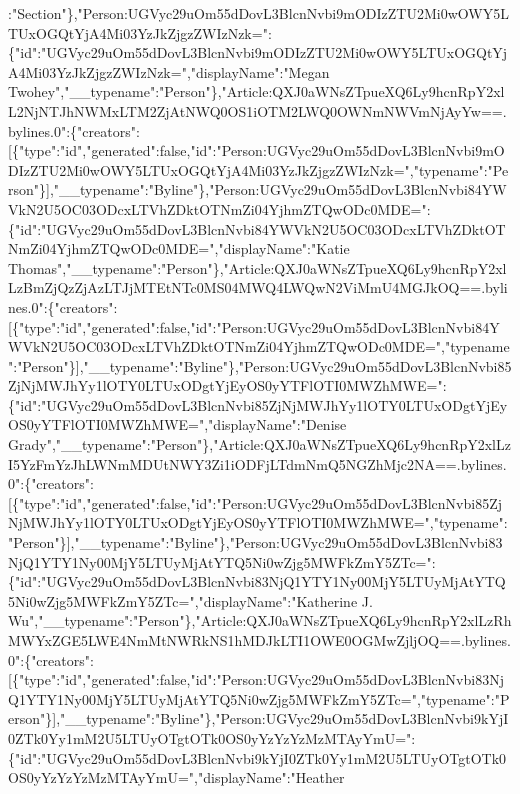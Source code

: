 :"Section"\},"Person:UGVyc29uOm55dDovL3BlcnNvbi9mODIzZTU2Mi0wOWY5LTUxOGQtYjA4Mi03YzJkZjgzZWIzNzk=":\{"id":"UGVyc29uOm55dDovL3BlcnNvbi9mODIzZTU2Mi0wOWY5LTUxOGQtYjA4Mi03YzJkZjgzZWIzNzk=","displayName":"Megan
Twohey","\_\_typename":"Person"\},"Article:QXJ0aWNsZTpueXQ6Ly9hcnRpY2xlL2NjNTJhNWMxLTM2ZjAtNWQ0OS1iOTM2LWQ0OWNmNWVmNjAyYw==.bylines.0":\{"creators":{[}\{"type":"id","generated":false,"id":"Person:UGVyc29uOm55dDovL3BlcnNvbi9mODIzZTU2Mi0wOWY5LTUxOGQtYjA4Mi03YzJkZjgzZWIzNzk=","typename":"Person"\}{]},"\_\_typename":"Byline"\},"Person:UGVyc29uOm55dDovL3BlcnNvbi84YWVkN2U5OC03ODcxLTVhZDktOTNmZi04YjhmZTQwODc0MDE=":\{"id":"UGVyc29uOm55dDovL3BlcnNvbi84YWVkN2U5OC03ODcxLTVhZDktOTNmZi04YjhmZTQwODc0MDE=","displayName":"Katie
Thomas","\_\_typename":"Person"\},"Article:QXJ0aWNsZTpueXQ6Ly9hcnRpY2xlLzBmZjQzZjAzLTJjMTEtNTc0MS04MWQ4LWQwN2ViMmU4MGJkOQ==.bylines.0":\{"creators":{[}\{"type":"id","generated":false,"id":"Person:UGVyc29uOm55dDovL3BlcnNvbi84YWVkN2U5OC03ODcxLTVhZDktOTNmZi04YjhmZTQwODc0MDE=","typename":"Person"\}{]},"\_\_typename":"Byline"\},"Person:UGVyc29uOm55dDovL3BlcnNvbi85ZjNjMWJhYy1lOTY0LTUxODgtYjEyOS0yYTFlOTI0MWZhMWE=":\{"id":"UGVyc29uOm55dDovL3BlcnNvbi85ZjNjMWJhYy1lOTY0LTUxODgtYjEyOS0yYTFlOTI0MWZhMWE=","displayName":"Denise
Grady","\_\_typename":"Person"\},"Article:QXJ0aWNsZTpueXQ6Ly9hcnRpY2xlLzI5YzFmYzJhLWNmMDUtNWY3Zi1iODFjLTdmNmQ5NGZhMjc2NA==.bylines.0":\{"creators":{[}\{"type":"id","generated":false,"id":"Person:UGVyc29uOm55dDovL3BlcnNvbi85ZjNjMWJhYy1lOTY0LTUxODgtYjEyOS0yYTFlOTI0MWZhMWE=","typename":"Person"\}{]},"\_\_typename":"Byline"\},"Person:UGVyc29uOm55dDovL3BlcnNvbi83NjQ1YTY1Ny00MjY5LTUyMjAtYTQ5Ni0wZjg5MWFkZmY5ZTc=":\{"id":"UGVyc29uOm55dDovL3BlcnNvbi83NjQ1YTY1Ny00MjY5LTUyMjAtYTQ5Ni0wZjg5MWFkZmY5ZTc=","displayName":"Katherine
J.
Wu","\_\_typename":"Person"\},"Article:QXJ0aWNsZTpueXQ6Ly9hcnRpY2xlLzRhMWYxZGE5LWE4NmMtNWRkNS1hMDJkLTI1OWE0OGMwZjljOQ==.bylines.0":\{"creators":{[}\{"type":"id","generated":false,"id":"Person:UGVyc29uOm55dDovL3BlcnNvbi83NjQ1YTY1Ny00MjY5LTUyMjAtYTQ5Ni0wZjg5MWFkZmY5ZTc=","typename":"Person"\}{]},"\_\_typename":"Byline"\},"Person:UGVyc29uOm55dDovL3BlcnNvbi9kYjI0ZTk0Yy1mM2U5LTUyOTgtOTk0OS0yYzYzYzMzMTAyYmU=":\{"id":"UGVyc29uOm55dDovL3BlcnNvbi9kYjI0ZTk0Yy1mM2U5LTUyOTgtOTk0OS0yYzYzYzMzMTAyYmU=","displayName":"Heather
